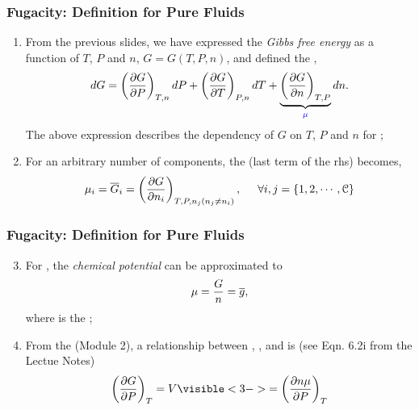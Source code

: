 \documentclass[10pt,compress,unknownkeysallowed]{beamer}
\begin{document}
\begin{frame}
  \frametitle{Fugacity: Definition for Pure Fluids}
        \begin{enumerate}%
           \item<1-> From the previous slides, we have expressed the {\it Gibbs free energy} as a function of $T$, $P$ and $n$, \ie $G=G(T,P,n)$, and defined the ,
              \begin{displaymath}
                dG = \Partial[G]{P}{T,n}dP + \Partial[G]{T}{P,n}dT + \underbrace{\Partial[G]{n}{T,P}}_{\blue{\mu}}dn.
              \end{displaymath}
              The above expression describes the dependency of $G$ on $T$, $P$ and $n$ for ;
           \item<2-> For an arbitrary number of components, the  (\ie last term of the rhs) becomes,
             \begin{displaymath}
               \mu_{i} = \overline{G}_{i}=\Partial[G]{n_{i}}{T,P,n_{j} \left(n_{j}\ne n_{i}\right)}, \hspace{0.5cm} \forall i,j=\left\{1,2,\cdots,\mathcal{C}\right\}
               \end{displaymath}
        \end{enumerate}
\end{frame}
\normalsize


\begin{frame}
  \frametitle{Fugacity: Definition for Pure Fluids}
        \begin{enumerate}\setcounter{enumi}{2}  
           \item<1-> For , the {\it chemical potential} can be approximated to
             \begin{displaymath}
               \mu = \frc{G}{n} = \overline{g},
             \end{displaymath}
             where  is the ;
             
           \item<2-> From the  (Module 2), a relationship between , ,  and  is (see Eqn. 6.2i from the Lectue Notes)
             \begin{displaymath}
                \Partial[G]{P}{T} = V \visible<3->{= \Partial[n\mu]{P}{T}}
             \end{displaymath}
               
        \end{enumerate}
\end{frame}
\normalsize
\end{document}
